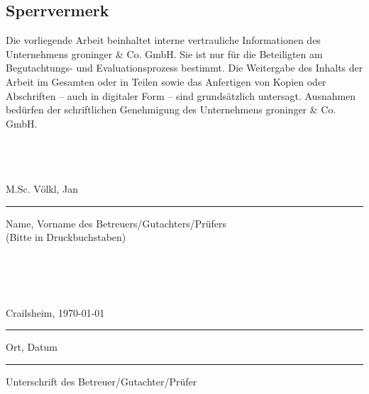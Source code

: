 \newpage
\setcounter{page}{2}

% 

% 

\subsection*{Sperrvermerk}
Die vorliegende Arbeit beinhaltet interne vertrauliche Informationen des Unternehmens groninger \& Co. GmbH. Sie ist nur für die Beteiligten am Begutachtungs- und Evaluationsprozess bestimmt. Die Weitergabe des Inhalts der Arbeit im Gesamten oder in Teilen sowie das Anfertigen von Kopien oder Abschriften – auch in digitaler Form – sind grundsätzlich untersagt. Ausnahmen bedürfen der schriftlichen Genehmigung des Unternehmens groninger \& Co. GmbH. \\ \\ \\ \\

\hspace{2cm}
\parbox{9cm}{\centering M.Sc. Völkl, Jan \hrule
\strut \centering\footnotesize Name, Vorname des Betreuers/Gutachters/Prüfers \\ (Bitte in Druckbuchstaben)} \\ \\ \\

\parbox[t][][t]{5cm}{\centering Crailsheim, \today \hrule \strut \centering \footnotesize Ort, Datum} %
\hspace{3cm}
\parbox[t][][t]{5cm}{\vspace{0.09cm} \hrule \strut \centering \footnotesize  Unterschrift des Betreuer/Gutachter/Prüfer}
